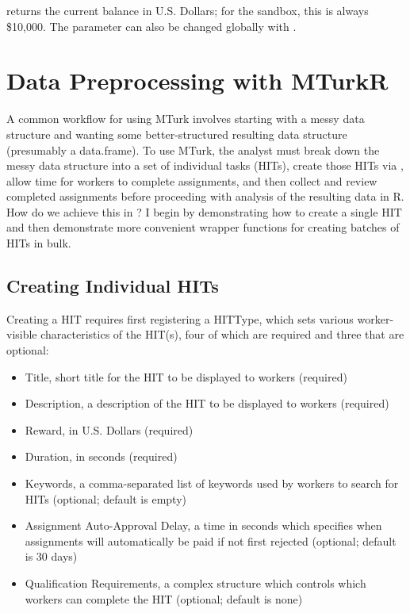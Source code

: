\noindent {} returns the current balance in U.S. Dollars; for the sandbox, this is always \$10,000. The  parameter can also be changed globally with . 


\section{Data Preprocessing with MTurkR}

A common workflow for using MTurk involves starting with a messy data structure and wanting some better-structured resulting data structure (presumably a data.frame). To use MTurk, the analyst must break down the messy data structure into a set of individual tasks (HITs), create those HITs via , allow time for workers to complete assignments, and then collect and review completed assignments before proceeding with analysis of the resulting data in R. How do we achieve this in ? I begin by demonstrating how to create a single HIT and then demonstrate more convenient wrapper functions for creating batches of HITs in bulk.

\subsection{Creating Individual HITs}
Creating a HIT requires first registering a HITType, which sets various worker-visible characteristics of the HIT(s), four of which are required and three that are optional:

\begin{itemize}
\item Title, short title for the HIT to be displayed to workers (required)
\item Description, a description of the HIT to be displayed to workers (required)
\item Reward, in U.S. Dollars (required)
\item Duration, in seconds (required)
\item Keywords, a comma-separated list of keywords used by workers to search for HITs (optional; default is empty)
\item Assignment Auto-Approval Delay, a time in seconds which specifies when assignments will automatically be paid if not first rejected (optional; default is 30 days)
\item Qualification Requirements, a complex structure which controls which workers can complete the HIT (optional; default is none)
\end{itemize}


